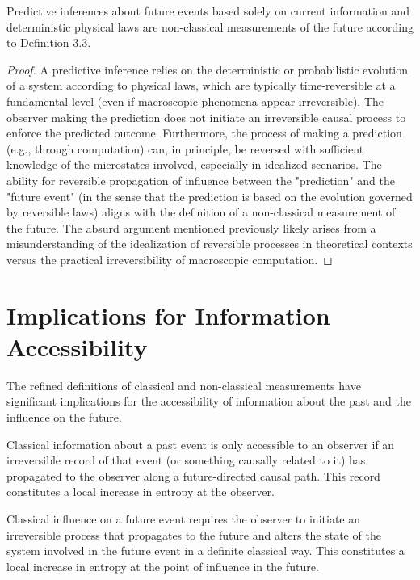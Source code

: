 	\begin{proposition}
		Predictive inferences about future events based solely on current information and deterministic physical laws are non-classical measurements of the future according to Definition 3.3.
		\begin{proof}
			A predictive inference relies on the deterministic or probabilistic evolution of a system according to physical laws, which are typically time-reversible at a fundamental level (even if macroscopic phenomena appear irreversible). The observer making the prediction does not initiate an irreversible causal process to enforce the predicted outcome. Furthermore, the process of making a prediction (e.g., through computation) can, in principle, be reversed with sufficient knowledge of the microstates involved, especially in idealized scenarios. The ability for reversible propagation of influence between the "prediction" and the "future event" (in the sense that the prediction is based on the evolution governed by reversible laws) aligns with the definition of a non-classical measurement of the future. The absurd argument mentioned previously likely arises from a misunderstanding of the idealization of reversible processes in theoretical contexts versus the practical irreversibility of macroscopic computation.
		\end{proof}
	\end{proposition}
	
	\section{Implications for Information Accessibility}
	
	The refined definitions of classical and non-classical measurements have significant implications for the accessibility of information about the past and the influence on the future.
	
	\begin{observation}
		Classical information about a past event is only accessible to an observer if an irreversible record of that event (or something causally related to it) has propagated to the observer along a future-directed causal path. This record constitutes a local increase in entropy at the observer.
	\end{observation}
	
	\begin{observation}
		Classical influence on a future event requires the observer to initiate an irreversible process that propagates to the future and alters the state of the system involved in the future event in a definite classical way. This constitutes a local increase in entropy at the point of influence in the future.
	\end{observation}
	
